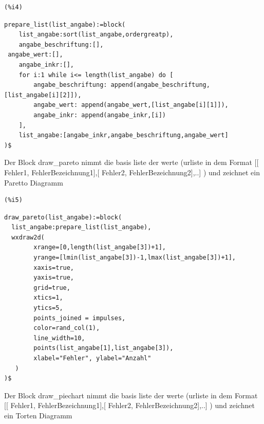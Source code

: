 \documentclass[12pt]{article}
\begin{document}
\noindent
\begin{minipage}[t]{8ex}{\color{red}\bf
\begin{verbatim}
(%i4) 
\end{verbatim}}
\end{minipage}
\begin{minipage}[t]{\textwidth}{\color{blue}
\begin{verbatim}
prepare_list(list_angabe):=block(
    list_angabe:sort(list_angabe,ordergreatp),
    angabe_beschriftung:[],
 angabe_wert:[],
    angabe_inkr:[],
    for i:1 while i<= length(list_angabe) do [
        angabe_beschriftung: append(angabe_beschriftung,[list_angabe[i][2]]),
        angabe_wert: append(angabe_wert,[list_angabe[i][1]]),
        angabe_inkr: append(angabe_inkr,[i])
    ],
    list_angabe:[angabe_inkr,angabe_beschriftung,angabe_wert]
)$
\end{verbatim}}
\end{minipage}

Der Block  draw\_pareto nimmt die basis liste der werte 
    (urliste in dem Format [[ Fehler1, FehlerBezeichnung1],[ Fehler2, FehlerBezeichnung2],..] )
und zeichnet ein Paretto Diagramm

\noindent
\begin{minipage}[t]{8ex}{\color{red}\bf
\begin{verbatim}
(%i5) 
\end{verbatim}}
\end{minipage}
\begin{minipage}[t]{\textwidth}{\color{blue}
\begin{verbatim}
draw_pareto(list_angabe):=block(
  list_angabe:prepare_list(list_angabe),
  wxdraw2d(
        xrange=[0,length(list_angabe[3])+1], 
        yrange=[lmin(list_angabe[3])-1,lmax(list_angabe[3])+1], 
        xaxis=true, 
        yaxis=true, 
        grid=true, 
        xtics=1, 
        ytics=5,
        points_joined = impulses,
        color=rand_col(1),
        line_width=10,
        points(list_angabe[1],list_angabe[3]),
        xlabel="Fehler", ylabel="Anzahl"
   )
)$
\end{verbatim}}
\end{minipage}

Der Block  draw\_piechart nimmt die basis liste der werte 
    (urliste in dem Format [[ Fehler1, FehlerBezeichnung1],[ Fehler2, FehlerBezeichnung2],..] )
und zeichnet ein Torten Diagramm
\end{document}
